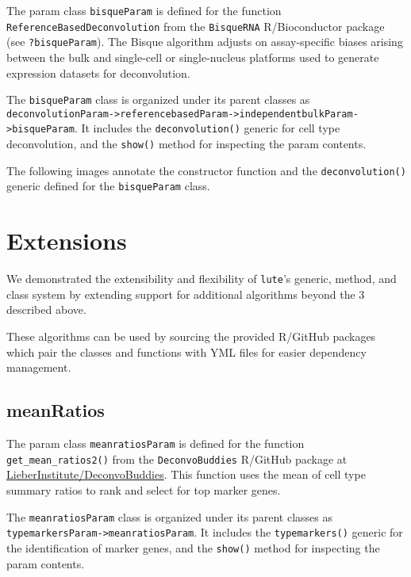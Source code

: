 \documentclass[]{article}
\begin{document}
The param class \texttt{bisqueParam} is defined for the function
\texttt{ReferenceBasedDeconvolution} from the \texttt{BisqueRNA} R/Bioconductor package (see
\texttt{?bisqueParam}). The Bisque algorithm adjusts on assay-specific biases arising
between the bulk and single-cell or single-nucleus platforms used to generate
expression datasets for deconvolution.

The \texttt{bisqueParam} class is organized under its parent classes as
\texttt{deconvolutionParam-\textgreater{}referencebasedParam-\textgreater{}independentbulkParam-\textgreater{}bisqueParam}.
It includes the \texttt{deconvolution()} generic for cell type deconvolution, and the
\texttt{show()} method for inspecting the param contents.

The following images annotate the constructor function and the \texttt{deconvolution()}
generic defined for the \texttt{bisqueParam} class.

\hypertarget{extensions}{%
\section{Extensions}\label{extensions}}

We demonstrated the extensibility and flexibility of \texttt{lute}'s generic, method,
and class system by extending support for additional algorithms beyond the 3
described above.

These algorithms can be used by sourcing the provided R/GitHub packages which
pair the classes and functions with YML files for easier dependency management.

\hypertarget{meanratios}{%
\subsection{meanRatios}\label{meanratios}}

The param class \texttt{meanratiosParam} is defined for the function
\texttt{get\_mean\_ratios2()} from the \texttt{DeconvoBuddies} R/GitHub package at \href{https://github.com/LieberInstitute/DeconvoBuddies}{LieberInstitute/DeconvoBuddies}.
This function uses the mean of cell type summary ratios to rank and select for
top marker genes.

The \texttt{meanratiosParam} class is organized under its parent classes as
\texttt{typemarkersParam-\textgreater{}meanratiosParam}. It includes the \texttt{typemarkers()} generic for
the identification of marker genes, and the \texttt{show()} method for inspecting the
param contents.
\end{document}
